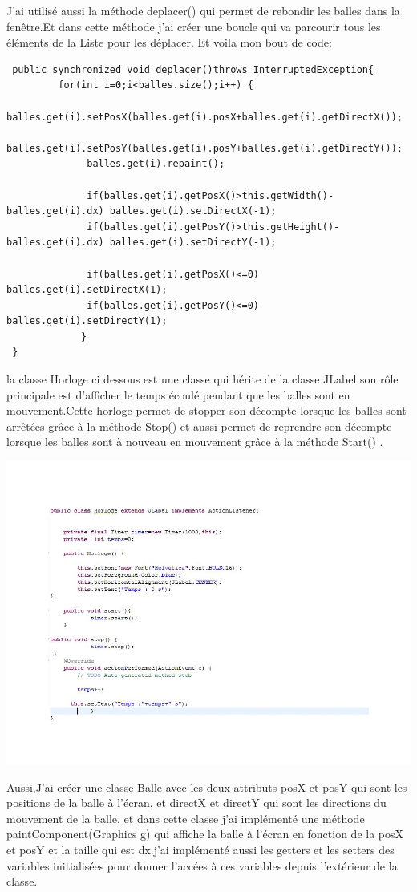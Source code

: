 \documentclass{article}
\begin{document}
J'ai utilisé aussi la méthode deplacer() qui permet de rebondir les balles dans la fenêtre.Et dans cette méthode j'ai créer une boucle qui va parcourir tous les éléments de la Liste pour les déplacer. Et voila mon bout de code:

\begin{verbatim}
 public synchronized void deplacer()throws InterruptedException{
		 for(int i=0;i<balles.size();i++) {
			  balles.get(i).setPosX(balles.get(i).posX+balles.get(i).getDirectX());
			  balles.get(i).setPosY(balles.get(i).posY+balles.get(i).getDirectY());
			  balles.get(i).repaint();
			  
			  if(balles.get(i).getPosX()>this.getWidth()-balles.get(i).dx) balles.get(i).setDirectX(-1);
			  if(balles.get(i).getPosY()>this.getHeight()-balles.get(i).dx) balles.get(i).setDirectY(-1);
			  
			  if(balles.get(i).getPosX()<=0) balles.get(i).setDirectX(1);
			  if(balles.get(i).getPosY()<=0) balles.get(i).setDirectY(1);
			 }
 }
\end{verbatim}

 la classe Horloge ci dessous est une classe qui hérite de la classe JLabel son rôle principale est d'afficher le temps écoulé pendant que les balles sont en mouvement.Cette horloge permet de stopper son décompte lorsque les balles sont arrêtées grâce à la méthode Stop() et aussi permet de reprendre  son décompte lorsque les balles sont à nouveau en mouvement grâce à la méthode Start() .
\begin{center}
  \includegraphics[scale=0.5]{hor.JPG}
\end{center}
Aussi,J'ai créer une classe Balle avec les deux attributs posX et posY qui sont les positions de la balle à l'écran, et directX et directY qui sont les directions du mouvement de la balle, et dans cette classe j'ai implémenté une méthode paintComponent(Graphics g) qui affiche la balle à l'écran en fonction de la posX et posY et la taille qui est dx.j'ai implémenté aussi les getters et les setters des variables initialisées pour donner l'accées à ces variables depuis l'extérieur de la classe.
\\
\\
\\
\end{document}
